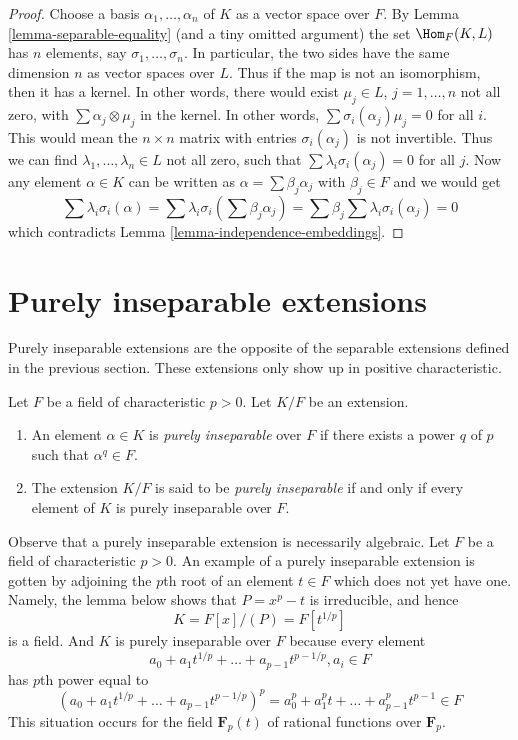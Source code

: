 \begin{proof}
Choose a basis $\alpha_1, \ldots, \alpha_n$ of $K$ as a vector space over $F$.
By Lemma \ref{lemma-separable-equality} (and a tiny omitted argument) the set
$\Hom_F(K, L)$ has $n$ elements, say $\sigma_1, \ldots, \sigma_n$.
In particular, the two sides have the same dimension $n$ as vector
spaces over $L$. Thus if the map is not an isomorphism, then it
has a kernel. In other words, there would exist
$\mu_j \in L$, $j = 1, \ldots, n$ not all zero,
with $\sum \alpha_j \otimes \mu_j$ in the kernel.
In other words, $\sum \sigma_i(\alpha_j)\mu_j = 0$ for all $i$.
This would mean the $n \times n$ matrix with entries
$\sigma_i(\alpha_j)$ is not invertible. Thus we can find
$\lambda_1, \ldots, \lambda_n \in L$ not all zero,
such that $\sum \lambda_i\sigma_i(\alpha_j) = 0$ for all $j$.
Now any element $\alpha \in K$ can be written as
$\alpha = \sum \beta_j \alpha_j$ with $\beta_j \in F$ and we would get
$$
\sum \lambda_i\sigma_i(\alpha) =
\sum \lambda_i\sigma_i(\sum \beta_j \alpha_j) =
\sum \beta_j \sum \lambda_i\sigma_i(\alpha_j) = 0
$$
which contradicts Lemma \ref{lemma-independence-embeddings}.
\end{proof}







\section{Purely inseparable extensions}
\label{section-purely-inseparable}

\noindent
Purely inseparable extensions are the opposite of the separable
extensions defined in the previous section. These extensions only
show up in positive characteristic.

\begin{definition}
\label{definition-purely-inseparable}
Let $F$ be a field of characteristic $p > 0$. Let $K/F$ be an extension.
\begin{enumerate}
\item An element $\alpha \in K$ is {\it purely inseparable} over $F$
if there exists a power $q$ of $p$ such that $\alpha^q \in F$.
\item The extension $K/F$ is said to be {\it purely inseparable}
if and only if every element of $K$ is purely inseparable over $F$.
\end{enumerate}
\end{definition}

\noindent
Observe that a purely inseparable extension is necessarily algebraic.
Let $F$ be a field of characteristic $p > 0$.
An example of a purely inseparable extension is gotten by adjoining
the $p$th root of an element $t \in F$ which does not yet have one. Namely,
the lemma below shows that $P = x^p - t$ is irreducible, and hence
$$
K = F[x]/(P) = F[t^{1/p}]
$$
is a field. And $K$ is purely inseparable over $F$ because every element
$$
a_0 + a_1t^{1/p} + \ldots + a_{p - 1}t^{p - 1/p}, a_i \in F
$$
has $p$th power equal to
$$
(a_0 + a_1t^{1/p} + \ldots + a_{p - 1}t^{p - 1/p})^p =
a_0^p + a_1^p t + \ldots + a_{p - 1}^pt^{p - 1} \in F
$$
This situation occurs for the field
$\mathbf{F}_p(t)$ of rational functions over $\mathbf{F}_p$.

